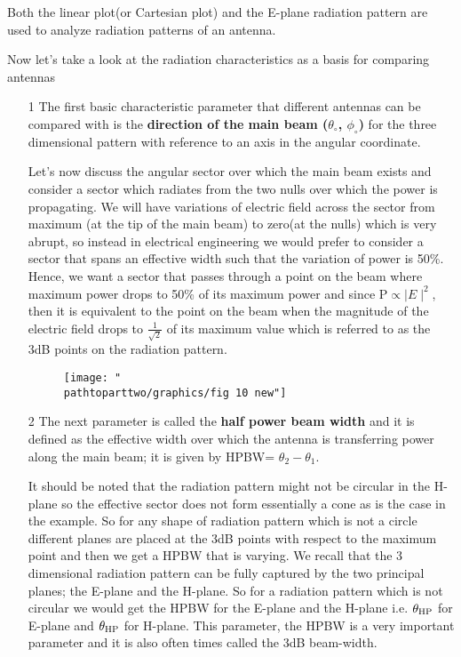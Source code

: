Both the linear plot(or Cartesian plot) and the E-plane radiation pattern are used to analyze radiation patterns of an antenna.

Now let's take a look at the radiation characteristics as a basis for comparing antennas
\begin{enumerate}
\item[1]The first basic characteristic parameter that different antennas can be compared with is the \textbf{direction of the main beam ($\theta_\circ$, $\phi_\circ$)} for the three dimensional pattern with reference to an axis in the angular coordinate.

Let's now discuss the angular sector over which the main beam exists and consider a sector which radiates from the two nulls over which the power is propagating. We will have variations of electric field across the sector from maximum (at the tip of the main beam) to zero(at the nulls) which is very abrupt, so instead in electrical engineering we would prefer to consider a sector that spans an effective width such that the variation of power is 50\%. Hence, we want a sector that passes through a point on the beam where maximum power drops to 50\% of its maximum power and since P$\propto \mid E\mid^{2}$, then it is equivalent to the point on the beam when the magnitude of the electric field drops to $\frac{1}{\sqrt{2}}$ of its maximum value which is referred to as the 3dB points on the radiation pattern.

\begin{figure}[h]
\centering
\texttt{[image: "\\pathtoparttwo/graphics/fig 10 new"]}
\label{figure10}
\end{figure}
\item[2]The next parameter is called the \textbf{half power beam width} and it is defined as the effective width over which the antenna is transferring power along the main beam; it is given by HPBW= $\theta_2 -\theta_1$.

It should be noted that the radiation pattern might not be circular in the H-plane so the effective sector does not form essentially a cone as is the case in the example. So for any shape of radiation pattern which is not a circle different planes are placed at the 3dB points with respect to the maximum point and then we get a HPBW that is varying. We recall that the 3 dimensional radiation pattern can be fully captured by the two principal planes; the E-plane and the H-plane. So for a radiation pattern which is not circular we would get the HPBW for the E-plane and the H-plane i.e. $\theta_{\textnormal{HP}}$ for E-plane and $\theta_{\textnormal{HP}}$ for H-plane. This parameter, the HPBW is a very important parameter and it is also often times called the 3dB beam-width.  


\end{enumerate}
